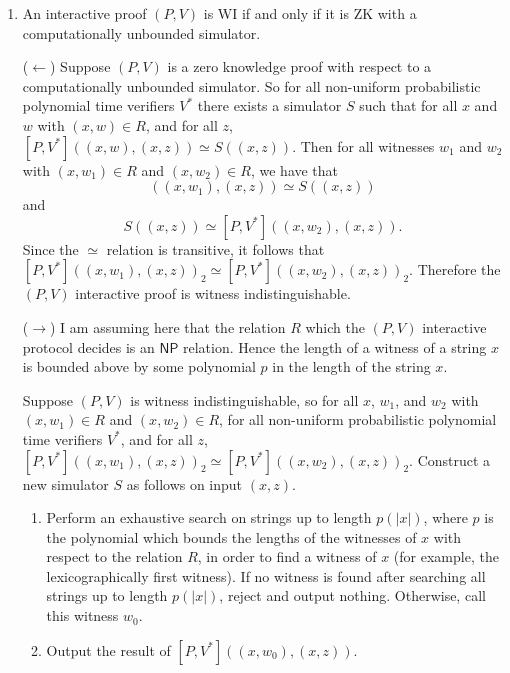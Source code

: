 \documentclass{article}
\begin{document}
\begin{enumerate}
\item
  An interactive proof $(P, V)$ is WI if and only if it is ZK with a computationally unbounded simulator.

  ($\leftarrow$) Suppose $(P, V)$ is a zero knowledge proof with respect to a computationally unbounded simulator.
  So for all non-uniform probabilistic polynomial time verifiers $V^*$ there exists a simulator $S$ such that for all $x$ and $w$ with $(x,w)\in R$, and for all $z$, $[P, V^*]\left((x, w), (x, z)\right)\simeq S\left((x, z)\right)$.
  Then for all witnesses $w_1$ and $w_2$ with $(x,w_1)\in R$ and $(x,w_2)\in R$, we have that
  \begin{displaymath}
    [P, V*]\left((x, w_1), (x, z)\right)\simeq S\left((x, z)\right)
  \end{displaymath}
  and
  \begin{displaymath}
    S\left((x, z)\right)\simeq[P, V^*]\left((x, w_2), (x, z)\right).
  \end{displaymath}
  Since the $\simeq$ relation is transitive, it follows that $[P, V^*]\left((x, w_1), (x, z)\right)_2\simeq[P, V^*]\left((x, w_2), (x, z)\right)_2$.
  Therefore the $(P, V)$ interactive proof is witness indistinguishable.

  ($\rightarrow$) I am assuming here that the relation $R$ which the $(P, V)$ interactive protocol decides is an $\mathsf{NP}$ relation.
  Hence the length of a witness of a string $x$ is bounded above by some polynomial $p$ in the length of the string $x$.

 Suppose $(P, V)$ is witness indistinguishable, so for all $x$, $w_1$, and $w_2$ with $(x, w_1)\in R$ and $(x, w_2)\in R$, for all non-uniform probabilistic polynomial time verifiers $V^*$, and for all $z$, $[P, V^*]\left((x, w_1), (x, z)\right)_2\simeq [P, V^*]\left((x, w_2), (x, z)\right)_2$.
  Construct a new simulator $S$ as follows on input $(x, z)$.
  \begin{enumerate}
  \item
    Perform an exhaustive search on strings up to length $p(|x|)$, where $p$ is the polynomial which bounds the lengths of the witnesses of $x$ with respect to the relation $R$, in order to find a witness of $x$ (for example, the lexicographically first witness).
    If no witness is found after searching all strings up to length $p(|x|)$, reject and output nothing.
    Otherwise, call this witness $w_0$.
  \item Output the result of $[P, V^*]\left((x, w_0), (x, z)\right)$.
  \end{enumerate}


\end{enumerate}
\end{document}
